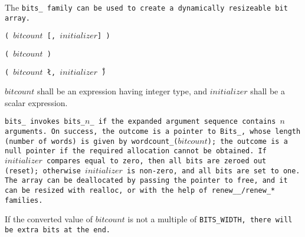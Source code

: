 The \tt{bits_} family can be used to create a dynamically resizeable bit array.


\s\s\s\tt{(} $bitcount$ [\tt{,} $initializer$] \tt{)}

\s\tt{(}   $bitcount$ \tt{)}

\s\tt{(}   $bitcount$ \l\tt{,} $initializer$\r\ \tt{)}


$bitcount$ shall be an expression having integer type,
and $initializer$ shall be a scalar expression.


\tt{bits_} invokes \tt{bits_}$n$\_ if the
expanded argument sequence contains $n$ arguments.
On success, the outcome is a pointer to \tt{Bits_},
whose length (number of words) is given by \tt{wordcount_(}$bitcount$\tt{)};
the outcome is a null pointer if the required allocation cannot be obtained.
If $initializer$ compares equal to zero, then all bits are zeroed out (reset);
otherwise $initializer$ is non-zero, and all bits are set to one.
The array can be deallocated by passing the pointer to \tt{free}, and it can be
resized with \tt{realloc}, or with the help of \tt{renew__}/\tt{renew_}* families.

\note If the converted value of $bitcount$ is not a multiple
of \tt{BITS_WIDTH}, there will be extra bits at the end.
